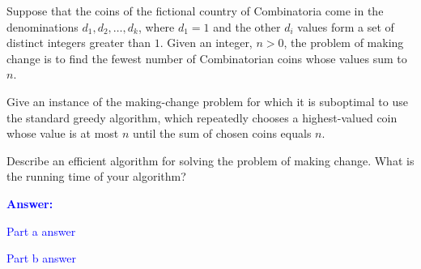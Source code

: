\item{}
Suppose that the coins of the fictional country of Combinatoria come in the
denominations $d_1,d_2,\ldots,d_k$, where $d_1=1$ and the other $d_i$ values form
a set of distinct integers greater than $1$. Given an integer, $n>0$, the
problem of making change is to find the fewest number of Combinatorian coins
whose values sum to $n$.
\begin{list}{\textbf{}}{}
\item Give an instance of the making-change problem for which it is suboptimal
    to use the standard greedy algorithm, which repeatedly chooses a
    highest-valued coin whose value is at most $n$ until the sum of chosen coins
    equals $n$.
\item Describe an efficient algorithm for solving the problem of making change.
    What is the running time of your algorithm?
\end{list}
\vskip12pt
\ifanswers
\textcolor{blue}{
\textbf{Answer:}\\
\begin{list}{\textbf{}}{}
\item Part a answer
\item Part b answer
\end{list}
}
\newpage
\fi

